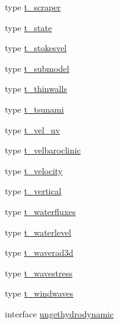 \begin{DoxyCompactItemize}
type \mbox{\hyperlink{structmodulehydrodynamic_1_1t__scraper}{t\+\_\+scraper}}
\item 
type \mbox{\hyperlink{structmodulehydrodynamic_1_1t__state}{t\+\_\+state}}
\item 
type \mbox{\hyperlink{structmodulehydrodynamic_1_1t__stokesvel}{t\+\_\+stokesvel}}
\item 
type \mbox{\hyperlink{structmodulehydrodynamic_1_1t__submodel}{t\+\_\+submodel}}
\item 
type \mbox{\hyperlink{structmodulehydrodynamic_1_1t__thinwalls}{t\+\_\+thinwalls}}
\item 
type \mbox{\hyperlink{structmodulehydrodynamic_1_1t__tsunami}{t\+\_\+tsunami}}
\item 
type \mbox{\hyperlink{structmodulehydrodynamic_1_1t__vel__uv}{t\+\_\+vel\+\_\+uv}}
\item 
type \mbox{\hyperlink{structmodulehydrodynamic_1_1t__velbaroclinic}{t\+\_\+velbaroclinic}}
\item 
type \mbox{\hyperlink{structmodulehydrodynamic_1_1t__velocity}{t\+\_\+velocity}}
\item 
type \mbox{\hyperlink{structmodulehydrodynamic_1_1t__vertical}{t\+\_\+vertical}}
\item 
type \mbox{\hyperlink{structmodulehydrodynamic_1_1t__waterfluxes}{t\+\_\+waterfluxes}}
\item 
type \mbox{\hyperlink{structmodulehydrodynamic_1_1t__waterlevel}{t\+\_\+waterlevel}}
\item 
type \mbox{\hyperlink{structmodulehydrodynamic_1_1t__waverad3d}{t\+\_\+waverad3d}}
\item 
type \mbox{\hyperlink{structmodulehydrodynamic_1_1t__wavestress}{t\+\_\+wavestress}}
\item 
type \mbox{\hyperlink{structmodulehydrodynamic_1_1t__windwaves}{t\+\_\+windwaves}}
\item 
interface \mbox{\hyperlink{interfacemodulehydrodynamic_1_1ungethydrodynamic}{ungethydrodynamic}}
\end{DoxyCompactItemize}
